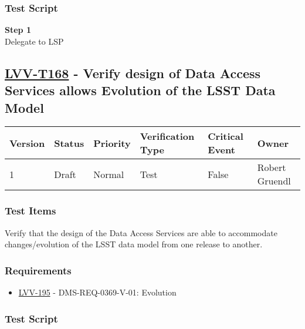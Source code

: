 \subsubsection{Test Script}\label{test-script-31}

\textbf{Step 1}\\
Delegate to LSP\\[2\baselineskip]

\hypertarget{lvv-t168---verify-design-of-data-access-services-allows-evolution-of-the-lsst-data-model}{\subsection{\texorpdfstring{\href{https://jira.lsstcorp.org/secure/Tests.jspa\#/testCase/LVV-T168}{LVV-T168}
- Verify design of Data Access Services allows Evolution of the LSST
Data
Model}{LVV-T168 - Verify design of Data Access Services allows Evolution of the LSST Data Model}}\label{lvv-t168---verify-design-of-data-access-services-allows-evolution-of-the-lsst-data-model}}

\begin{longtable}[]{@{}llllll@{}}
\toprule
Version & Status & Priority & Verification Type & Critical Event &
Owner\tabularnewline
\midrule
\endhead
1 & Draft & Normal & Test & False & Robert Gruendl\tabularnewline
\bottomrule
\end{longtable}

\subsubsection{Test Items}\label{test-items-32}

Verify that the design of the Data Access Services are able to
accommodate changes/evolution of the LSST data model from one release to
another.

\subsubsection{Requirements}\label{requirements-32}

\begin{itemize}
\tightlist
\item
  \href{https://jira.lsstcorp.org/browse/LVV-195}{LVV-195} -
  DMS-REQ-0369-V-01: Evolution
\end{itemize}

\subsubsection{Test Script}\label{test-script-32}

